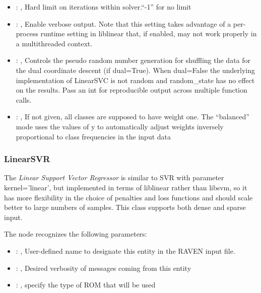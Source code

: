 \begin{itemize}
    \item {}: ,
      Hard limit on iterations within solver.``-1'' for no limit

    \item {}: ,
      Enable verbose output. Note that this setting takes advantage
      of a per-process runtime setting in liblinear that, if enabled, may not
      work properly in a multithreaded context.

    \item {}: ,
      Controls the pseudo random number generation for shuffling
      the data for the dual coordinate descent (if dual=True). When dual=False
      the underlying implementation of LinearSVC is not random and
      random\_state has no effect on the results. Pass an int for reproducible
      output across multiple function calls.

    \item {}: \xmlDesc{[balanced]},
      If not given, all classes are supposed to have weight one.
      The “balanced” mode uses the values of y to automatically adjust weights
      inversely proportional to class frequencies in the input data
  \end{itemize}


\subsubsection{LinearSVR}
  The  \textit{Linear Support Vector Regressor} is
  similar to SVR with parameter kernel=’linear’, but implemented in terms of liblinear rather than
  libsvm,                             so it has more flexibility in the choice of penalties and loss
  functions and should scale better to large numbers of samples.                             This
  class supports both dense and sparse input.

  The  node recognizes the following parameters:
    \begin{itemize}
      \item {}: ,
        User-defined name to designate this entity in the RAVEN input file.
      \item {}: ,
        Desired verbosity of messages coming from this entity
      \item {}: ,
        specify the type of ROM that will be used
  \end{itemize}

